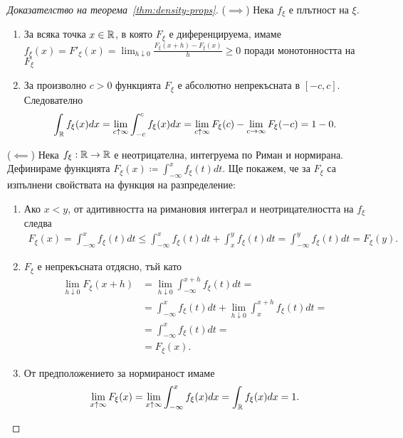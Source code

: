\documentclass[numbers=endperiod, bibliography=totocnumbered]{scrartcl}
\begin{document}
\begin{proof}[Доказателство на теорема~\ref{thm:density-props}]
  (\( \implies \)) Нека \( f_\xi \) е плътност на \( \xi \).
  \begin{enumerate}
    \item За всяка точка \( x \in \mathbb{R} \), в която \( F_\xi \) е диференцируема, имаме \( f_\xi(x) = F'_\xi(x) = \lim_{h \downarrow 0} \frac {F_\xi(x + h) - F_\xi(x)} h \geq 0 \) поради монотонността на \( F_\xi \)
    \item За произволно \( c > 0 \) функцията \( F_\xi \) е абсолютно непрекъсната в \( [-c, c] \). Следователно
    \begin{align*}
      \int_{\mathbb{R}} f_\xi(x) dx
      =
      \lim_{c \uparrow \infty} \int_{-c}^c f_\xi(x) dx
      =
      \lim_{c \uparrow \infty} F_\xi(c) - \lim_{c \to \infty} F_\xi(-c)
      =
      1 - 0.
    \end{align*}
  \end{enumerate}

  (\( \impliedby \)) Нека \( f_\xi: \mathbb{R} \to \mathbb{R} \) е неотрицателна, интегруема по Риман и нормирана. Дефинираме функцията \( F_\xi(x) \coloneqq \int_{-\infty}^x f_\xi(t) dt \). Ще покажем, че за \( F_\xi \) са изпълнени свойствата на функция на разпределение:
  \begin{enumerate}
    \item Ако \( x < y \), от адитивността на римановия интеграл и неотрицателността на \( f_\xi \) следва
    \begin{align*}
      F_\xi(x)
      =
      \int_{-\infty}^x f_\xi(t) dt
      \leq
      \int_{-\infty}^x f_\xi(t) dt + \int_x^y f_\xi(t) dt
      =
      \int_{-\infty}^y f_\xi(t) dt
      =
      F_\xi(y).
    \end{align*}

    \item \( F_\xi \) е непрекъсната отдясно, тъй като
    \begin{align*}
      \lim_{h \downarrow 0} F_\xi(x + h)
      &=
      \lim_{h \downarrow 0} \int_{-\infty}^{x + h} f_\xi(t) dt
      = \\ &=
      \int_{-\infty}^x f_\xi(t) dt + \lim_{h \downarrow 0} \int_x^{x + h} f_\xi(t) dt
      = \\ &=
      \int_{-\infty}^x f_\xi(t) dt
      = \\ &=
      F_\xi(x).
    \end{align*}

    \item От предположението за нормираност имаме
    \begin{align*}
      \lim_{x \uparrow \infty} F_\xi(x)
      =
      \lim_{x \uparrow \infty} \int_{-\infty}^x f_\xi(x) dx
      =
      \int_{\mathbb{R}} f_\xi(x) dx = 1.
    \end{align*}


\end{enumerate}
\end{proof}
\end{document}
